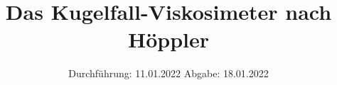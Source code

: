 

\subject{V 107}
\title{Das Kugelfall-Viskosimeter nach Höppler}
\date{%
  Durchführung: 11.01.2022
  \hspace{3em}
  Abgabe: 18.01.2022
}



\maketitle
\thispagestyle{empty}
\tableofcontents
\newpage






\printbibliography{}


